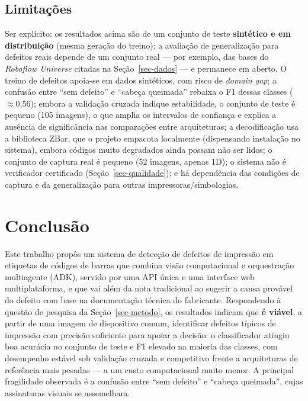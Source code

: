 \documentclass[
	article,			%
	11pt,				%
	oneside,			%
	a4paper,			%
	english,			%
	brazilian,			%
	sumario=tradicional
	]{abntex2}
\begin{document}
\subsection{Limitações}

Ser explícito: os resultados acima são de um conjunto de teste \textbf{sintético e em
distribuição} (mesma geração do treino); a avaliação de generalização para defeitos
reais depende de um conjunto real --- por exemplo, das bases do \textit{Roboflow
Universe} citadas na Seção~\ref{sec-dados} --- e permanece em aberto. O treino de
defeitos apoia-se em dados sintéticos, com risco de \textit{domain gap}; a confusão
entre ``sem defeito'' e ``cabeça queimada'' rebaixa o F1 dessas classes ($\approx$0,56);
embora a validação cruzada indique estabilidade, o conjunto de teste é pequeno (105
imagens), o que amplia os intervalos de confiança e explica a ausência de significância
nas comparações entre arquiteturas; a decodificação usa a biblioteca ZBar, que o
projeto empacota localmente (dispensando instalação no sistema), embora códigos muito
degradados ainda possam não ser lidos; o conjunto de captura real é pequeno (52
imagens, apenas 1D); o sistema não é verificador certificado
(Seção~\ref{sec-qualidade}); e há dependência das condições de captura e da
generalização para outras impressoras/simbologias.

\section{Conclusão}\label{sec-conclusao}

Este trabalho propôs um sistema de detecção de defeitos de impressão em etiquetas
de códigos de barras que combina visão computacional e orquestração multiagente
(ADK), servido por uma API única e uma interface web multiplataforma, e que vai
além da nota tradicional ao sugerir a causa provável do defeito com base na
documentação técnica do fabricante. Respondendo à questão de pesquisa da
Seção~\ref{sec-metodo}, os resultados indicam que \textbf{é viável}, a partir de uma
imagem de dispositivo comum, identificar defeitos típicos de impressão com precisão
suficiente para apoiar a decisão: o classificador atingiu boa acurácia no conjunto
de teste e F1 elevado na maioria das classes, com desempenho estável sob validação
cruzada e competitivo frente a arquiteturas de referência mais pesadas --- a um custo
computacional muito menor. A principal fragilidade observada é a confusão entre
``sem defeito'' e ``cabeça queimada'', cujas assinaturas visuais se assemelham.
\end{document}
